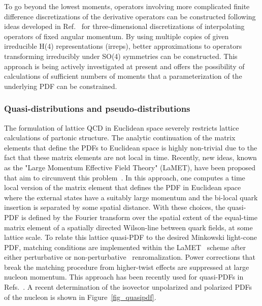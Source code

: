 To go beyond the lowest moments, operators involving more complicated finite difference discretizations of the derivative operators can be constructed following ideas developed in Ref.~\cite{Davoudi:2012ya} for  three-dimensional discretizations of interpolating operators of fixed angular momentum. By using multiple copies of given irreducible H(4) representations (irreps), better approximations to operators transforming irreducibly under SO(4) symmetries can be constructed. This approach is being actively investigated at present \cite{IDavoudiLattice2018} and offers the possibility of calculations of sufficient numbers of moments that a parameterization of the underlying PDF can be constrained.



\subsubsection{Quasi-distributions and pseudo-distributions}



 

The formulation of lattice QCD in Euclidean space severely restricts
lattice calculations of partonic structure.  
The analytic continuation of the matrix elements that define the PDFs to Euclidean space is highly non-trivial due to the fact that these matrix elements are not local in time. Recently, new ideas,  known as the "Large Momentum Effective Field Theory" (LaMET),  have
been proposed that aim to circumvent this problem~\cite{Ji:2013dva,Ji:2014gla}.
In this approach, one computes a time local version of the matrix element that defines the PDF in Euclidean space
where the external states have a suitably large momentum  and the
bi-local quark insertion is separated by some spatial distance.
%
With these choices, the quasi-PDF is defined by the Fourier transform over the spatial extent of the equal-time matrix element of a spatially directed Wilson-line between quark fields, at some lattice scale. To relate this lattice quasi-PDF to the desired Minkowski light-cone PDF, matching conditions are implemented within the LaMET~\cite{Ji:2013dva,Ji:2014gla} scheme after either perturbative or non-perturbative~\cite{Martinelli:1994ty} renromalization. Power corrections that break the matching  procedure from  higher-twist effects are suppressed at large nucleon momentum. This approach has been recently used  for quasi-PDFs  in Refs.~\cite{Alexandrou:2017huk,Chen:2017mzz,Green:2017xeu,Chen:2018xof,Lin:2018qky}. A recent determination of the isovector unpolarized and polarized PDFs of the  nucleon is shown in Figure~\ref{fig_quasipdf}.

